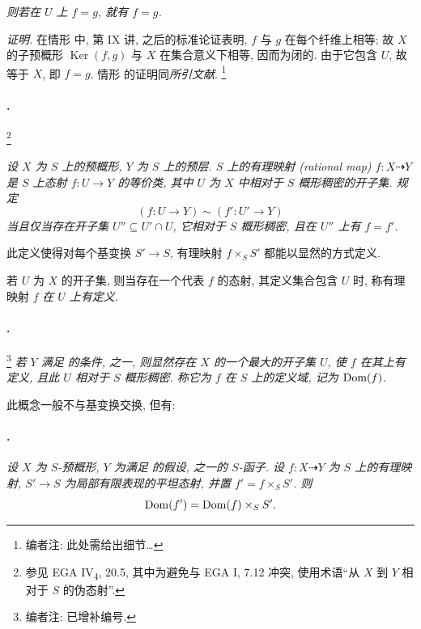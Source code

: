 \textit{则若在 \(U\) 上 \(f=g\), 就有 \(f=g\).}

\textit{证明.}
在情形 中,
第 IX 讲,  之后的标准论证表明,
\(f\) 与 \(g\) 在每个纤维上相等;
故 \(X\) 的子预概形 \(\operatorname{Ker}(f,g)\) 与 \(X\) 在集合意义下相等, 因而为闭的.
由于它包含 \(U\), 故等于 \(X\), 即 \(f=g\).
情形 的证明同\textit{所引文献}.
\footnote{编者注: 此处需给出细节\ldots}

\paragraph{.}
\begingroup
\renewcommand{\thefootnote}{*}
\footnote{参见 EGA IV\textsubscript{4}, 20.5,
其中为避免与 EGA I, 7.12 冲突, 使用术语“从 \(X\) 到 \(Y\) 相对于 \(S\) 的伪态射”.}
\addtocounter{footnote}{-1}
\endgroup
\textit{设 \(X\) 为 \(S\) 上的预概形, \(Y\) 为 \(S\) 上的预层.
\(S\) 上的\emph{有理映射} (rational map) \(f:X\dashrightarrow Y\)
是 \(S\) 上态射 \(f:U\to Y\) 的等价类,
其中 \(U\) 为 \(X\) 中相对于 \(S\) 概形稠密的开子集.
规定
\[
  (f:U\to Y)\sim(f':U'\to Y)
\]
当且仅当存在开子集 \(U''\subseteq U'\cap U\),
它相对于 \(S\) 概形稠密, 且在 \(U''\) 上有 \(f=f'\).}

此定义使得对每个基变换 \(S'\to S\),
有理映射 \(f\times_S S'\) 都能以显然的方式定义.

若 \(U\) 为 \(X\) 的开子集, 则当存在一个代表 \(f\) 的态射,
其定义集合包含 \(U\) 时, 称有理映射 \(f\) \emph{在 \(U\) 上有定义}.

\paragraph{.}
\footnote{编者注: 已增补编号.}
\textit{若 \(Y\) 满足 的条件,
 之一,
则显然存在 \(X\) 的一个最大的开子集 \(U\), 使 \(f\) 在其上有定义,
且此 \(U\) 相对于 \(S\) 概形稠密.
称它为 \emph{\(f\) 在 \(S\) 上的定义域}, 记为 \(\operatorname{Dom}(f)\).}

此概念一般不与基变换交换, 但有:

\paragraph{.}
\textit{设 \(X\) 为 \(S\)-预概形, \(Y\) 为满足
的假设, 
之一的 \(S\)-函子.
设 \(f:X\dashrightarrow Y\) 为 \(S\) 上的有理映射,
\(S'\to S\) 为局部有限表现的平坦态射, 并置 \(f'=f\times_S S'\). 则}
\[
  \operatorname{Dom}(f')=\operatorname{Dom}(f)\times_S S'.
\]

